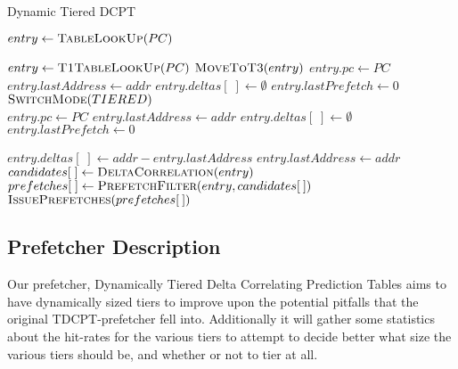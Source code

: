 \begin{algorithm}
\footnotesize
\caption{Dynamic Tiered DCPT \cite{Grannaes481837}}
  \begin{algorithmic}[1]
      \State $entry \gets \Call{TableLookUp}{PC}$

          \State $entry \gets \Call{T1TableLookUp}{PC}$
            \State $\Call{MoveToT3}{entry}$
          \Else
            \State $entry.pc \gets PC$
            \State $entry.lastAddress \gets addr$
            \State $entry.deltas[\;] \gets \emptyset$
            \State $entry.lastPrefetch \gets 0$
          \EndIf
        \Else
            \State $\Call{SwitchMode}{TIERED}$ \\
            \State $entry.pc \gets PC$
            \State $entry.lastAddress \gets addr$
            \State $entry.deltas[\;] \gets \emptyset$
            \State $entry.lastPrefetch \gets 0$
          \Else
            
          \EndIf
        \EndIf

        \State $entry.deltas[\;] \gets addr - entry.lastAddress$
        \State $entry.lastAddress \gets addr$ \\

        \State $candidates[\;] \gets \Call{DeltaCorrelation}{entry}$
        \State $prefetches[\;] \gets \Call{PrefetchFilter}{entry, candidates[\:]}$
        \State $\Call{IssuePrefetches}{prefetches[\:]}$
      \EndIf
    \EndProcedure
  \end{algorithmic}
  \label{alg:dcpt_dyn_tier}
\end{algorithm}


\subsection{Prefetcher Description}

Our prefetcher, Dynamically Tiered Delta Correlating Prediction
Tables aims to have dynamically sized tiers to improve upon the potential
pitfalls that the original TDCPT-prefetcher fell into. Additionally it will
gather some statistics about the hit-rates for the various tiers to attempt to
decide better what size the various tiers should be, and whether or not to tier
at all.

